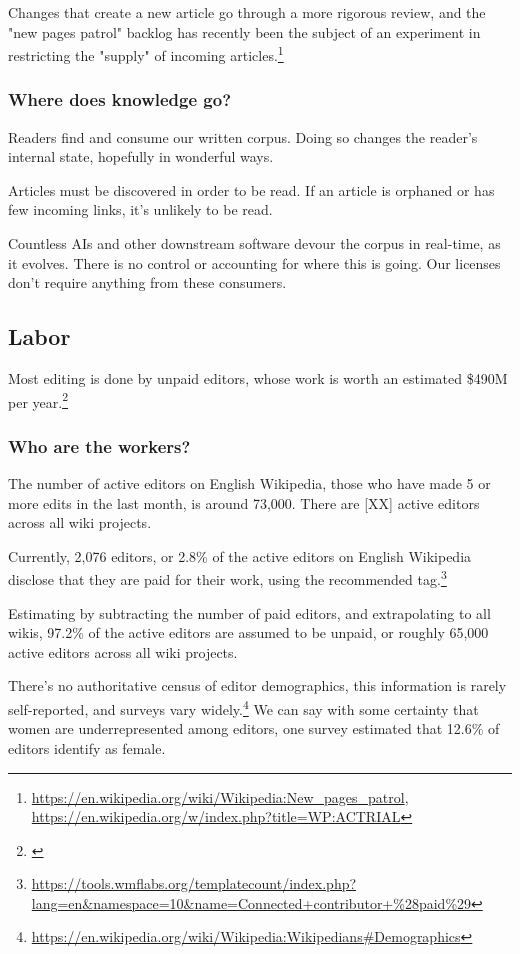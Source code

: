 \documentclass[format=sigconf, authorversion]{acmart}
\begin{document}
Changes that create a new article go through a more rigorous review, and the "new pages patrol" backlog has recently been the subject of an experiment in restricting the "supply" of incoming articles.\footnote{\url{https://en.wikipedia.org/wiki/Wikipedia:New_pages_patrol}, \url{https://en.wikipedia.org/w/index.php?title=WP:ACTRIAL}}

\subsubsection{Where does knowledge go?}

Readers find and consume our written corpus.  Doing so changes the reader's internal state, hopefully in wonderful ways.

Articles must be discovered in order to be read.  If an article is orphaned or has few incoming links, it's unlikely to be read.

Countless AIs and other downstream software devour the corpus in real-time, as it evolves.  There is no control or accounting for where this is going.  Our licenses don't require anything from these consumers.

\subsection{Labor}

Most editing is done by unpaid editors, whose work is worth an estimated \$490M per year.\footnote{\citep{Lund}}

\subsubsection{Who are the workers?}

The number of active editors on English Wikipedia, those who have made 5 or more edits in the last month, is around 73,000.  There are [XX] active editors across all wiki projects.

Currently, 2,076 editors, or 2.8\% of the active editors on English Wikipedia  disclose that they are paid for their work, using the recommended tag.\footnote{\url{https://tools.wmflabs.org/templatecount/index.php?lang=en&namespace=10&name=Connected+contributor+\%28paid\%29}}

Estimating by subtracting the number of paid editors, and extrapolating to all wikis, 97.2\% of the active editors are assumed to be unpaid, or roughly 65,000 active editors across all wiki projects.

There's no authoritative census of editor demographics, this information is rarely self-reported, and surveys vary widely.\footnote{\url{https://en.wikipedia.org/wiki/Wikipedia:Wikipedians\#Demographics}}  We can say with some certainty that women are underrepresented among editors, one survey estimated that 12.6\% of editors identify as female.
\end{document}
